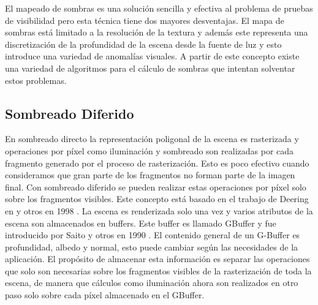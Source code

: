 El mapeado de sombras es una solución sencilla y efectiva al problema de pruebas de visibilidad pero esta técnica tiene dos mayores desventajas. El mapa de sombras está limitado a la resolución de la textura y además este representa una discretización de la profundidad de la escena desde la fuente de luz y esto introduce una variedad de anomalías visuales. A partir de este concepto existe una variedad de algoritmos para el cálculo de sombras que intentan solventar estos problemas.

\subsection{Sombreado Diferido}
\label{sub:deferred_rendering_theory}
En sombreado directo la representación poligonal de la escena es rasterizada y operaciones por píxel como iluminación y sombreado son realizadas por cada fragmento generado por el proceso de rasterización. Esto es poco efectivo cuando consideramos que gran parte de los fragmentos no forman parte de la imagen final.
Con sombreado diferido se pueden realizar estas operaciones por píxel solo sobre los fragmentos visibles. Este concepto está basado en el trabajo de Deering en y otros en 1998 \cite{Deering:1988}. La escena es renderizada solo una vez y varios atributos de la escena son almacenados en buffers. Este buffer es llamado \ac{GBuffer} y fue introducido por Saito y otros en 1990 \cite{Saito:1990}. El contenido general de un G-Buffer es profundidad, albedo y normal, esto puede cambiar según las necesidades de la aplicación. El propósito de almacenar esta información es separar las operaciones que solo son necesarias sobre los fragmentos visibles de la rasterización de toda la escena, de manera que cálculos como iluminación ahora son realizados en otro paso solo sobre cada píxel almacenado en el \ac{GBuffer}.

